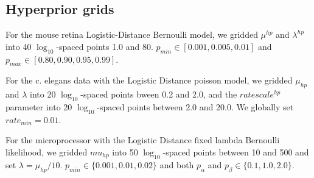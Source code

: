 \documentclass{article}
\begin{document}


\subsection{Hyperprior grids}
\label{supp:hyperpriors}

For the mouse retina Logistic-Distance Bernoulli model, we gridded $\mu^{hp}$ and $\lambda^{hp}$ into 40 $\log_{10}$-spaced points 1.0 and 80. $p_{min} \in [0.001, 0.005, 0.01]$ and $p_{max} \in [0.80, 0.90, 0.95, 0.99]$.

For the c. elegans data with the Logistic Distance poisson model, we gridded $\mu_{hp}$ and $\lambda$ into 20 $\log_{10}$-spaced points bween 0.2 and 2.0, and the $ratescale^{hp}$ parameter into 20 $\log_{10}$-spaced points between 2.0 and 20.0. We globally set $rate_{min}=0.01$. 

For the microprocessor with the Logistic Distance fixed lambda Bernoulli likelihood, we gridded $mu_{hp}$ into 50 $\log_{10}$-spaced points between 10 and 500 and set $\lambda=\mu_{hp}/10$. $p_{min} \in \{0.001, 0.01, 0.02\}$  and both $p_\alpha$ and $p_\beta \in \{0.1, 1.0, 2.0\}$. 



\printbibliography
\end{document}
